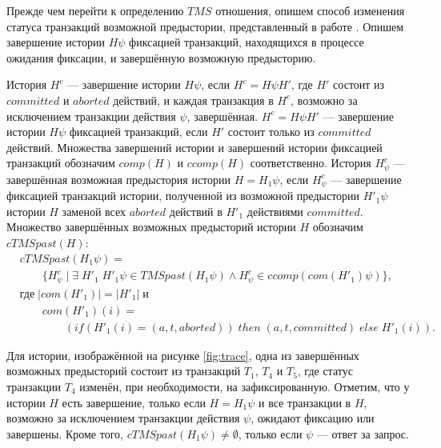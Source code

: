 Прежде чем перейти к определению $TMS$ отношения, опишем способ изменения статуса транзакций возможной предыстории, представленный в работе \cite{tms_article}. Опишем завершение истории $H\psi$ фиксацией транзакций, находящихся в процессе ожидания фиксации, и завершённую возможную предысторию.
\begin{mydefinition}\label{suff_comm_compl}
История $H^c$ --- завершение истории $H\psi$, если $H^c = H\psi{H'}$, где $H'$ состоит из $committed$ и $aborted$ действий, и каждая транзакция в $H^c$, возможно за исключением транзакции действия $\psi$, завершённая. $H^c = H\psi{H'}$ --- завершение истории $H\psi$ фиксацией транзакций, если $H'$ состоит только из $committed$ действий. Множества завершений истории и завершений истории фиксацией транзакций обозначим $comp(H)$ и $ccomp(H)$ соответственно.
История $H^c_{\psi}$ --- завершённая возможная предыстория истории $H = H_1\psi$, если $H^c_{\psi}$ --- завершение фиксацией транзакций истории, полученной из возможной предыстории $H'_1\psi$ истории $H$ заменой всех $aborted$ действий в $H'_1$ действиями $committed$. Множество завершённых возможных предысторий истории $H$ обозначим $cTMSpast(H)$: 
\begin{align*}
&cTMSpast(H_1\psi) = \\
&\qquad \{H^c_{\psi} \; | \; \exists \; H'_1  \; H'_1\psi \in TMSpast(H_1\psi) \land 
H^c_{\psi} \in ccomp(com(H'_1)\psi) \}, \\
&\text{где} \; |com(H'_1)| = |H'_1| \; \text{и} \\
& \qquad com(H'_1)(i) = \\
&\qquad \qquad (if \left (H'_1(i) = (a, t, aborted)\right)\; then \; (a, t, committed) \; else \; H'_1(i)).
\end{align*}
\end{mydefinition}

Для истории, изображённой на рисунке \ref{fig:trace}, одна из завершённых возможных предысторий состоит из транзакций $T_1$, $T_4$ и $T_5$, где статус транзакции $T_4$ изменён, при необходимости, на зафиксированную. Отметим, что у истории $H$ есть завершение, только если $H = H_1\psi$ и все транзакции в $H$, возможно за исключением транзакции действия $\psi$, ожидают фиксацию или завершены. Кроме того, $cTMSpast(H_1\psi) \neq \emptyset$, только если $\psi$ --- ответ за запрос.


